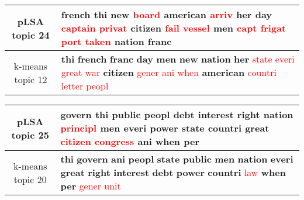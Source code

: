 \begin{center}\begin{tabularx}{\textwidth} {
  | c | >{\raggedright\arraybackslash}X | } \hline 
pLSA topic 24 & \textbf{french} \textbf{thi} \textbf{new} \textcolor{red}{board} \textbf{american} \textcolor{red}{arriv} \textbf{her} \textbf{day} \textcolor{red}{captain} \textcolor{red}{privat} \textbf{citizen} \textcolor{red}{fail} \textcolor{red}{vessel} \textbf{men} \textcolor{red}{capt} \textcolor{red}{frigat} \textcolor{red}{port} \textcolor{red}{taken} \textbf{nation} \textbf{franc} \\ \hline 
k-means topic 12 & \textbf{thi} \textbf{french} \textbf{franc} \textbf{day} \textbf{men} \textbf{new} \textbf{nation} \textbf{her} \textcolor{red}{state} \textcolor{red}{everi} \textcolor{red}{great} \textcolor{red}{war} \textbf{citizen} \textcolor{red}{gener} \textcolor{red}{ani} \textcolor{red}{when} \textbf{american} \textcolor{red}{countri} \textcolor{red}{letter} \textcolor{red}{peopl} \\ \hline 
\end{tabularx}

\end{center}

\begin{center}\begin{tabularx}{\textwidth} {
  | c | >{\raggedright\arraybackslash}X | } \hline 
pLSA topic 25 & \textbf{govern} \textbf{thi} \textbf{public} \textbf{peopl} \textbf{debt} \textbf{interest} \textbf{right} \textbf{nation} \textcolor{red}{principl} \textbf{men} \textbf{everi} \textbf{power} \textbf{state} \textbf{countri} \textbf{great} \textcolor{red}{citizen} \textcolor{red}{congress} \textbf{ani} \textbf{when} \textbf{per} \\ \hline 
k-means topic 20 & \textbf{thi} \textbf{govern} \textbf{ani} \textbf{peopl} \textbf{state} \textbf{public} \textbf{men} \textbf{nation} \textbf{everi} \textbf{great} \textbf{right} \textbf{interest} \textbf{debt} \textbf{power} \textbf{countri} \textcolor{red}{law} \textbf{when} \textbf{per} \textcolor{red}{gener} \textcolor{red}{unit} \\ \hline 
\end{tabularx}

\end{center}

